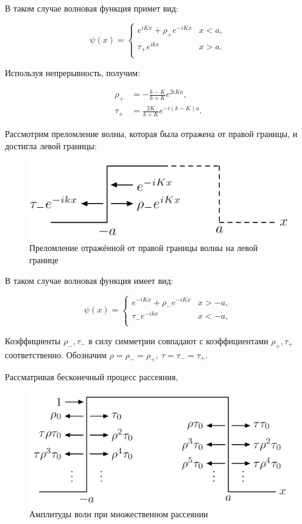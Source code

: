 \documentclass[a4 paper, 12 pt]{extarticle}
\begin{document}
   В таком случае волновая функция примет вид:
   
   \[
   \psi(x)=\left\{%
   \begin{array}{ll}
   e^{iKx}+\rho_+e^{-iKx} & x<a, \\
   \tau_+e^{ikx} & x>a. \\
   \end{array}%
   \right.
   \]
   
   Используя непрерывность, получим:
   
   \[
   \begin{aligned}
   \rho_+&=-\frac{k-K}{k+K}e^{2iKa},\\
   \tau_+&=\frac{2K}{k+K}e^{-i(k-K)a}.
   \end{aligned}
   \]
   
   Рассмотрим преломление волны, которая была отражена от правой границы, и достигла левой границы:
   
   \begin{figure}[!htb]
   	\centering
   	\includegraphics[scale=0.25]{reflect3.jpg}
   	\caption{Преломление отражённой от правой границы волны на левой границе}
   \end{figure}

   В таком случае волновая функция имеет вид:
   
   \[
   \psi(x)=\left\{%
   \begin{array}{ll}
   e^{-iKx}+\rho_-e^{-iKx} & x>-a, \\
   \tau_-e^{-ikx} & x<-a, \\
   \end{array}%
   \right.
   \]
   
   Коэффициенты $\rho_-, \tau_-$ в силу симметрии совпадают с коэффициентами $\rho_+, \tau_+$ соответственно. Обозначим $\rho = \rho_- = \rho_+, \ \tau = \tau_- = \tau_+$.
   

   Рассматривая бесконечный процесс рассеяния,
   
   \begin{figure}[!htb]
   	\centering
   	\includegraphics[scale=0.25]{reflect4.jpg}
   	\caption{Амплитуды волн при множественном рассеянии}
   \end{figure}
\end{document}
